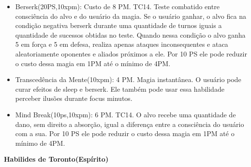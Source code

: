 \begin{itemize}
	\item Berserk(20PS,10xpm): Custo de 8 PM. TC14.\newline
Teste combatido entre consciência do alvo e do usuário da magia. Se o usuário ganhar, o alvo fica na condição negativa berserk durante uma quantidade de turnos iguais a quantidade de sucessos obtidas no teste. Quando nessa condição o alvo ganha 5 em força e 5 em defesa, realiza apenas ataques inconsequentes e ataca aleatoriamente oponentes e aliados próximos a ele. Por 10 PS ele pode reduzir o custo dessa magia em 1PM até o mínimo de 4PM.

	\item Transcedência da Mente(10xpm): 4 PM. Magia instantânea.\newline
O usuário pode curar efeitos de sleep e berserk. Ele também pode usar essa habilidade perceber ilusões durante focus minutos.

\item Mind Break(10ps,10xpm): 6 PM. TC14.\newline
O alvo recebe uma quantidade de dano, sem direito a absorção, igual a diferença entre a consciência do usuário com a sua. Por 10 PS ele pode reduzir o custo dessa magia em 1PM até o mínimo de 4PM.


\end{itemize}


\textbf{Habilides de Toronto(Espírito)}

